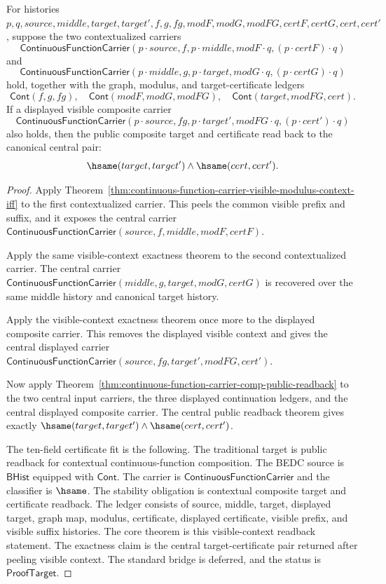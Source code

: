 \begin{theorem}
\label{thm:continuous-function-carrier-visible-modulus-context-composition-public-readback}
For histories
$p,q,source,middle,target,target',f,g,fg,modF,modG,modFG,certF,certG,cert,cert'$,
suppose the two contextualized carriers
$$
\mathsf{ContinuousFunctionCarrier}(p\cdot source,f,p\cdot middle,
modF\cdot q,(p\cdot certF)\cdot q)
$$
and
$$
\mathsf{ContinuousFunctionCarrier}(p\cdot middle,g,p\cdot target,
modG\cdot q,(p\cdot certG)\cdot q)
$$
hold, together with the graph, modulus, and target-certificate ledgers
$$
\mathsf{Cont}(f,g,fg),\quad
\mathsf{Cont}(modF,modG,modFG),\quad
\mathsf{Cont}(target,modFG,cert).
$$
If a displayed visible composite carrier
$$
\mathsf{ContinuousFunctionCarrier}(p\cdot source,fg,p\cdot target',
modFG\cdot q,(p\cdot cert')\cdot q)
$$
also holds, then the public composite target and certificate read back to the
canonical central pair:
$$
\hsame(target,target')\land\hsame(cert,cert').
$$
\end{theorem}
\begin{proof}
Apply Theorem~\ref{thm:continuous-function-carrier-visible-modulus-context-iff}
to the first contextualized carrier. This peels the common visible prefix and
suffix, and it exposes the central carrier
$\mathsf{ContinuousFunctionCarrier}(source,f,middle,modF,certF)$.

Apply the same visible-context exactness theorem to the second contextualized
carrier. The central carrier
$\mathsf{ContinuousFunctionCarrier}(middle,g,target,modG,certG)$ is recovered
over the same middle history and canonical target history.

Apply the visible-context exactness theorem once more to the displayed
composite carrier. This removes the displayed visible context and gives the
central displayed carrier
$\mathsf{ContinuousFunctionCarrier}(source,fg,target',modFG,cert')$.

Now apply
Theorem~\ref{thm:continuous-function-carrier-comp-public-readback} to the two
central input carriers, the three displayed continuation ledgers, and the
central displayed composite carrier. The central public readback theorem gives
exactly $\hsame(target,target')\land\hsame(cert,cert')$.

The ten-field certificate fit is the following. The traditional target is
public readback for contextual continuous-function composition. The BEDC
source is $\mathsf{BHist}$ equipped with $\mathsf{Cont}$. The carrier is
$\mathsf{ContinuousFunctionCarrier}$ and the classifier is $\hsame$. The
stability obligation is contextual composite target and certificate readback.
The ledger consists of source, middle, target, displayed target, graph map,
modulus, certificate, displayed certificate, visible prefix, and visible suffix
histories. The core theorem is this visible-context readback statement. The
exactness claim is the central target-certificate pair returned after peeling
visible context. The standard bridge is deferred, and the status is
$\mathsf{ProofTarget}$.
\end{proof}

